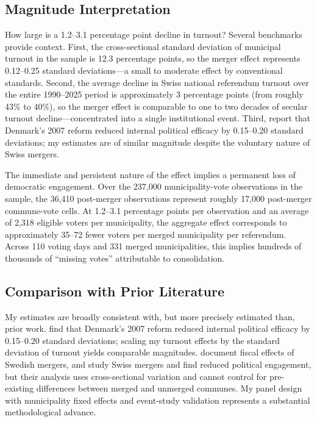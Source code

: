 \documentclass[12pt]{article}
\begin{document}
\subsection{Magnitude Interpretation}

How large is a 1.2--3.1 percentage point decline in turnout? Several benchmarks provide context. First, the cross-sectional standard deviation of municipal turnout in the sample is 12.3 percentage points, so the merger effect represents 0.12--0.25 standard deviations---a small to moderate effect by conventional standards. Second, the average decline in Swiss national referendum turnout over the entire 1990--2025 period is approximately 3 percentage points (from roughly 43\% to 40\%), so the merger effect is comparable to one to two decades of secular turnout decline---concentrated into a single institutional event. Third, \citet{lassen2011jurisdictional} report that Denmark's 2007 reform reduced internal political efficacy by 0.15--0.20 standard deviations; my estimates are of similar magnitude despite the voluntary nature of Swiss mergers.

The immediate and persistent nature of the effect implies a permanent loss of democratic engagement. Over the 237,000 municipality-vote observations in the sample, the 36,410 post-merger observations represent roughly 17,000 post-merger commune-vote cells. At 1.2--3.1 percentage points per observation and an average of 2,318 eligible voters per municipality, the aggregate effect corresponds to approximately 35--72 fewer voters per merged municipality per referendum. Across 110 voting days and 331 merged municipalities, this implies hundreds of thousands of ``missing votes'' attributable to consolidation.

\subsection{Comparison with Prior Literature}

My estimates are broadly consistent with, but more precisely estimated than, prior work. \citet{lassen2011jurisdictional} find that Denmark's 2007 reform reduced internal political efficacy by 0.15--0.20 standard deviations; scaling my turnout effects by the standard deviation of turnout yields comparable magnitudes. \citet{jordahl2010merger} document fiscal effects of Swedish mergers, and \citet{fritz2020municipal} study Swiss mergers and find reduced political engagement, but their analysis uses cross-sectional variation and cannot control for pre-existing differences between merged and unmerged communes. My panel design with municipality fixed effects and event-study validation represents a substantial methodological advance.
\end{document}
